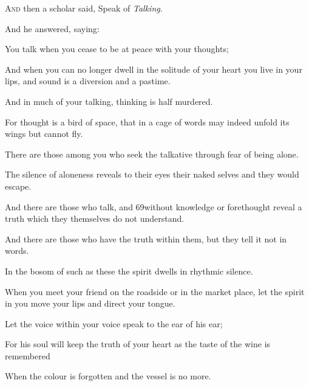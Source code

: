 \lettrine{A}{nd} then a scholar said, Speak of
\textit{Talking}.

\bigskip
And he answered, saying:

You talk when you cease to be at peace
with your thoughts;

And when you can no longer dwell in the
solitude of your heart you live in your
lips, and sound is a diversion and a
pastime.

And in much of your talking, thinking is
half murdered.

For thought is a bird of space, that in
a cage of words may indeed unfold its
wings but cannot fly.

There are those among you who seek the
talkative through fear of being alone.

The silence of aloneness reveals to
their eyes their naked selves and they
would escape.

And there are those who talk, and
{69}without knowledge or forethought reveal
a truth which they themselves do not
understand.

And there are those who have the truth
within them, but they tell it not in
words.

In the bosom of such as these the spirit
dwells in rhythmic silence.


When you meet your friend on the
roadside or in the market place, let the
spirit in you move your lips and direct
your tongue.

Let the voice within your voice speak to
the ear of his ear;

For his soul will keep the truth of
your heart as the taste of the wine is
remembered

When the colour is forgotten and the
vessel is no more.
